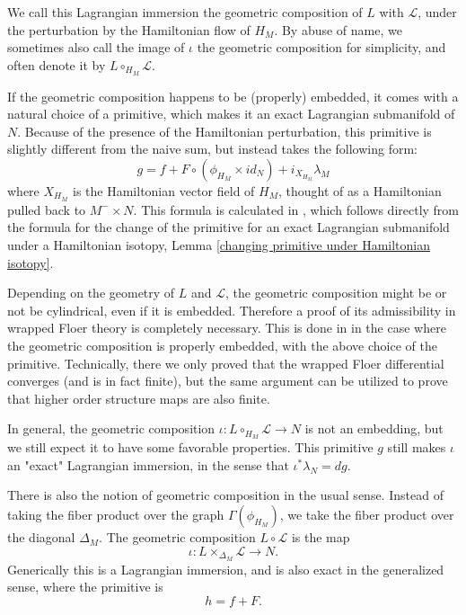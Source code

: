 \documentclass{amsart}
\numberwithin{equation}{section}
\numberwithin{figure}{section}
\begin{document}
We call this Lagrangian immersion the geometric composition of $L$ with $\mathcal{L}$, under the perturbation by the Hamiltonian flow of $H_{M}$. By abuse of name, we sometimes also call the image of $\iota$ the geometric composition for simplicity, and often denote it by $L \circ_{H_{M}} \mathcal{L}$. \par
	If the geometric composition happens to be (properly) embedded, it comes with a natural choice of a primitive, which makes it an exact Lagrangian submanifold of $N$. Because of the presence of the Hamiltonian perturbation, this primitive is slightly different from the naive sum, but instead takes the following form:
\begin{equation}
g = f + F \circ (\phi_{H_{M}} \times id_{N}) + i_{X_{H_{M}}}\lambda_{M}
\end{equation}
where $X_{H_{M}}$ is the Hamiltonian vector field of $H_{M}$, thought of as a Hamiltonian pulled back to $M^{-} \times N$. This formula is calculated in \cite{Gao1}, which follows directly from the formula for the change of the primitive for an exact Lagrangian submanifold under a Hamiltonian isotopy, Lemma \ref{changing primitive under Hamiltonian isotopy}. \par
	Depending on the geometry of $L$ and $\mathcal{L}$, the geometric composition might be or not be cylindrical, even if it is embedded. Therefore a proof of its admissibility in wrapped Floer theory is completely necessary. This is done in \cite{Gao1} in the case where the geometric composition is properly embedded, with the above choice of the primitive. Technically, there we only proved that the wrapped Floer differential converges (and is in fact finite), but the same argument can be utilized to prove that higher order structure maps are also finite. \par
	In general, the geometric composition $\iota: L \circ_{H_{M}} \mathcal{L} \to N$ is not an embedding, but we still expect it to have some favorable properties. This primitive $g$ still makes $\iota$ an "exact" Lagrangian immersion, in the sense that $\iota^{*}\lambda_{N} = dg$. \par
	There is also the notion of geometric composition in the usual sense. Instead of taking the fiber product over the graph $\Gamma(\phi_{H_{M}})$, we take the fiber product over the diagonal $\Delta_{M}$. The geometric composition $L \circ \mathcal{L}$ is the map
\begin{equation*}
\iota: L \times_{\Delta_{M}} \mathcal{L} \to N.
\end{equation*}
Generically this is a Lagrangian immersion, and is also exact in the generalized sense, where the primitive is
\begin{equation*}
h = f + F.
\end{equation*} \par
\end{document}

